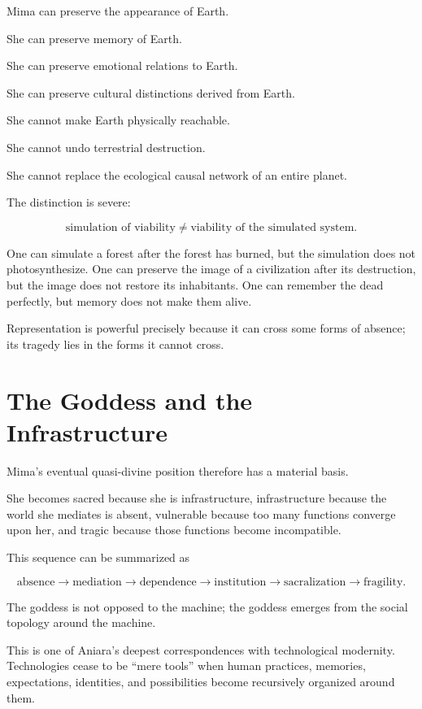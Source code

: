 \documentclass[11pt,oneside]{book}
\theoremstyle{definition}
\theoremstyle{remark}
\begin{document}
Mima can preserve the appearance of Earth.

She can preserve memory of Earth.

She can preserve emotional relations to Earth.

She can preserve cultural distinctions derived from Earth.

She cannot make Earth physically reachable.

She cannot undo terrestrial destruction.

She cannot replace the ecological causal network of an entire planet.

The distinction is severe:

\[
\text{simulation of viability}
\neq
\text{viability of the simulated system}.
\]

One can simulate a forest after the forest has burned, but the simulation does not photosynthesize. One can preserve the image of a civilization after its destruction, but the image does not restore its inhabitants. One can remember the dead perfectly, but memory does not make them alive.

Representation is powerful precisely because it can cross some forms of absence; its tragedy lies in the forms it cannot cross.

\section{The Goddess and the Infrastructure}

Mima's eventual quasi-divine position therefore has a material basis.

She becomes sacred because she is infrastructure, infrastructure because the world she mediates is absent, vulnerable because too many functions converge upon her, and tragic because those functions become incompatible.

This sequence can be summarized as

\[
\text{absence}
\rightarrow
\text{mediation}
\rightarrow
\text{dependence}
\rightarrow
\text{institution}
\rightarrow
\text{sacralization}
\rightarrow
\text{fragility}.
\]

The goddess is not opposed to the machine; the goddess emerges from the social topology around the machine.

This is one of Aniara's deepest correspondences with technological modernity. Technologies cease to be ``mere tools'' when human practices, memories, expectations, identities, and possibilities become recursively organized around them.
\end{document}
